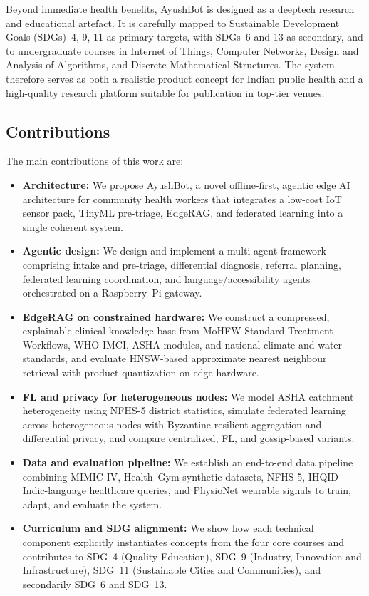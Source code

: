 \documentclass[conference]{IEEEtran}
\begin{document}
Beyond immediate health benefits, AyushBot is designed as a deeptech research and educational artefact. It is carefully mapped to Sustainable Development Goals (SDGs)~4, 9, 11 as primary targets, with SDGs~6 and 13 as secondary, and to undergraduate courses in Internet of Things, Computer Networks, Design and Analysis of Algorithms, and Discrete Mathematical Structures. The system therefore serves as both a realistic product concept for Indian public health and a high-quality research platform suitable for publication in top-tier venues.

\subsection{Contributions}
The main contributions of this work are:
\begin{itemize}
  \item \textbf{Architecture:} We propose AyushBot, a novel offline-first, agentic edge AI architecture for community health workers that integrates a low-cost IoT sensor pack, TinyML pre-triage, EdgeRAG, and federated learning into a single coherent system.
  \item \textbf{Agentic design:} We design and implement a multi-agent framework comprising intake and pre-triage, differential diagnosis, referral planning, federated learning coordination, and language/accessibility agents orchestrated on a Raspberry~Pi gateway.
  \item \textbf{EdgeRAG on constrained hardware:} We construct a compressed, explainable clinical knowledge base from MoHFW Standard Treatment Workflows, WHO IMCI, ASHA modules, and national climate and water standards, and evaluate HNSW-based approximate nearest neighbour retrieval with product quantization on edge hardware.
  \item \textbf{FL and privacy for heterogeneous nodes:} We model ASHA catchment heterogeneity using NFHS-5 district statistics, simulate federated learning across heterogeneous nodes with Byzantine-resilient aggregation and differential privacy, and compare centralized, FL, and gossip-based variants.
  \item \textbf{Data and evaluation pipeline:} We establish an end-to-end data pipeline combining MIMIC-IV, Health~Gym synthetic datasets, NFHS-5, IHQID Indic-language healthcare queries, and PhysioNet wearable signals to train, adapt, and evaluate the system.
  \item \textbf{Curriculum and SDG alignment:} We show how each technical component explicitly instantiates concepts from the four core courses and contributes to SDG~4 (Quality Education), SDG~9 (Industry, Innovation and Infrastructure), SDG~11 (Sustainable Cities and Communities), and secondarily SDG~6 and SDG~13.
\end{itemize}
\end{document}
